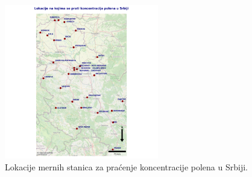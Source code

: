 \documentclass[12pt]{article}
\begin{document}
\begin{figure}[H]
    \centering
    \includegraphics[width=0.6\textwidth]{grafici/mapa_lokacija.png}
    \caption{Lokacije mernih stanica za praćenje koncentracije polena u Srbiji.}
    \label{fig:lokacije_polen_srbija}
\end{figure}
\end{document}
